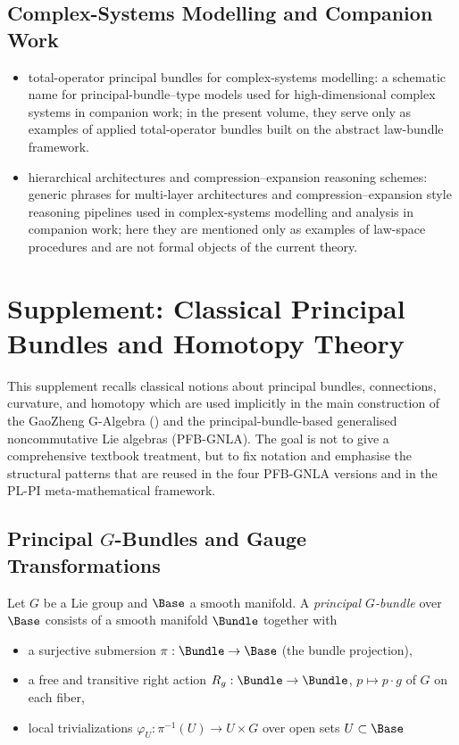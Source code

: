\documentclass[11pt]{book}
\theoremstyle{plain}
\theoremstyle{definition}
\begin{document}
\section{Complex-Systems Modelling and Companion Work}


\begin{itemize}
  \item total-operator principal bundles for complex-systems modelling:
        a schematic name for principal-bundle--type models used for
        high-dimensional complex systems in companion work; in the
        present volume, they serve only as examples of applied
        total-operator bundles built on the abstract law-bundle
        framework.
\item hierarchical architectures and compression--expansion reasoning schemes:
        generic phrases for multi-layer architectures and
        compression–expansion style reasoning pipelines used in
        complex-systems modelling and analysis in companion work; here
        they are mentioned only as examples of law-space procedures and
        are not formal objects of the current theory.
\end{itemize}

\chapter[Supplement: Principal Bundles and Homotopy]{Supplement: Classical Principal Bundles and Homotopy Theory}


This supplement recalls classical notions about principal bundles,
connections, curvature, and homotopy which are used implicitly in the
main construction of the GaoZheng G-Algebra (\GAlgebra) and the
principal-bundle-based generalised noncommutative Lie algebras
(PFB-GNLA). The goal is not to give a comprehensive textbook treatment,
but to fix notation and emphasise the structural patterns that are
reused in the four PFB-GNLA versions and in the PL-PI meta-mathematical
framework.



\section{Principal \texorpdfstring{$G$}{G}-Bundles and Gauge Transformations}


Let $G$ be a Lie group and $\Base$ a smooth manifold. A
\emph{principal $G$-bundle} over $\Base$ consists of a smooth manifold
$\Bundle$ together with

\begin{itemize}
  \item a surjective submersion $\pi:\Bundle\to\Base$ (the bundle
        projection),
  \item a free and transitive right action
        $R_g:\Bundle\to\Bundle$, $p\mapsto p\cdot g$ of $G$ on each
        fiber,
  \item local trivializations
        $\varphi_U:\pi^{-1}(U)\to U\times G$ over open sets
        $U\subset\Base$
\end{itemize}
\end{document}
